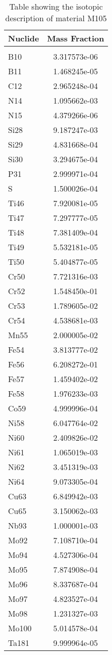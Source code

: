 \begin{centering}
\begin{table}[ht!]
\begin{tabular}{l | c}
\hline
Nuclide & Mass Fraction\\
\hline
\\
B10 & 3.317573e-06\\
B11 & 1.468245e-05\\
C12 & 2.965248e-04\\
N14 & 1.095662e-03\\
N15 & 4.379266e-06\\
Si28 & 9.187247e-03\\
Si29 & 4.831668e-04\\
Si30 & 3.294675e-04\\
P31 & 2.999971e-04\\
S & 1.500026e-04\\
Ti46 & 7.920081e-05\\
Ti47 & 7.297777e-05\\
Ti48 & 7.381409e-04\\
Ti49 & 5.532181e-05\\
Ti50 & 5.404877e-05\\
Cr50 & 7.721316e-03\\
Cr52 & 1.548450e-01\\
Cr53 & 1.789605e-02\\
Cr54 & 4.538681e-03\\
Mn55 & 2.000005e-02\\
Fe54 & 3.813777e-02\\
Fe56 & 6.208272e-01\\
Fe57 & 1.459402e-02\\
Fe58 & 1.976233e-03\\
Co59 & 4.999996e-04\\
Ni58 & 6.047764e-02\\
Ni60 & 2.409826e-02\\
Ni61 & 1.065019e-03\\
Ni62 & 3.451319e-03\\
Ni64 & 9.073305e-04\\
Cu63 & 6.849942e-03\\
Cu65 & 3.150062e-03\\
Nb93 & 1.000001e-03\\
Mo92 & 7.108710e-04\\
Mo94 & 4.527306e-04\\
Mo95 & 7.874908e-04\\
Mo96 & 8.337687e-04\\
Mo97 & 4.823527e-04\\
Mo98 & 1.231327e-03\\
Mo100 & 5.014578e-04\\
Ta181 & 9.999964e-05
\end{tabular}
\caption{Table showing the isotopic description of material M105}
\label{table:material_M105}
\end{table}\clearpage


\end{centering}
